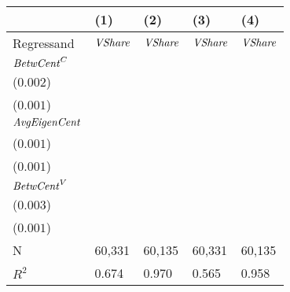 \begin{tabular}{lllll}
\toprule
{} &                                    (1) &                                    (2) &                                    (3) &                                    (4) \\
\midrule
Regressand           &                         ${\it VShare}$ &                         ${\it VShare}$ &                         ${\it VShare}$ &                         ${\it VShare}$ \\
${\it BetwCent}^C$   &  \makecell{$0.672^{***}$ \\ ($0.002$)} &  \makecell{$0.257^{***}$ \\ ($0.001$)} &                            \makecell{} &                            \makecell{} \\
${\it AvgEigenCent}$ &                            \makecell{} &  \makecell{$0.397^{***}$ \\ ($0.001$)} &                            \makecell{} &  \makecell{$0.426^{***}$ \\ ($0.001$)} \\
${\it BetwCent}^V$   &                            \makecell{} &                            \makecell{} &  \makecell{$0.756^{***}$ \\ ($0.003$)} &  \makecell{$0.258^{***}$ \\ ($0.001$)} \\
\midrule N           &                                 60,331 &                                 60,135 &                                 60,331 &                                 60,135 \\
$R^2$                &                                  0.674 &                                  0.970 &                                  0.565 &                                  0.958 \\
\bottomrule
\end{tabular}
